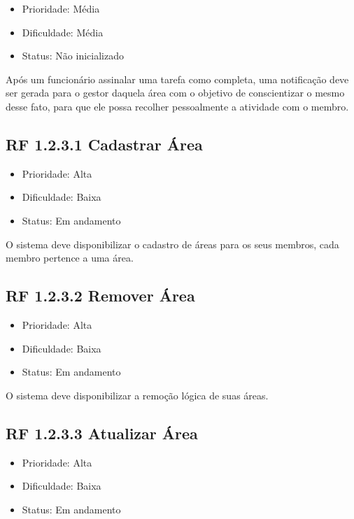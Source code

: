 \begin{itemize}
  \item{Prioridade: Média}
  \item{Dificuldade: Média}
  \item{Status: Não inicializado}
\end{itemize}

Após um funcionário assinalar uma tarefa como completa, uma notificação deve ser gerada para o gestor daquela área com o objetivo de conscientizar o mesmo desse fato, para que ele possa recolher pessoalmente a atividade com o membro.


\subsection{RF 1.2.3.1 Cadastrar Área}

\begin{itemize}
  \item{Prioridade: Alta}
  \item{Dificuldade: Baixa}
  \item{Status: Em andamento}
\end{itemize}

O sistema deve disponibilizar o cadastro de áreas para os seus membros, cada membro pertence a uma área.


\subsection{RF 1.2.3.2 Remover Área}

\begin{itemize}
  \item{Prioridade: Alta}
  \item{Dificuldade: Baixa}
  \item{Status: Em andamento}
\end{itemize}

O sistema deve disponibilizar a remoção lógica de suas áreas.


\subsection{RF 1.2.3.3 Atualizar Área}

\begin{itemize}
  \item{Prioridade: Alta}
  \item{Dificuldade: Baixa}
  \item{Status: Em andamento}
\end{itemize}

